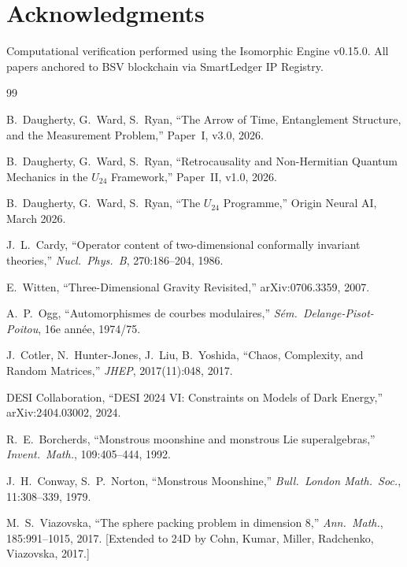 \documentclass[12pt,a4paper]{article}
\theoremstyle{definition}\newtheorem{definition}[theorem]{Definition}
\theoremstyle{remark}\newtheorem{remark}[theorem]{Remark}
\begin{document}
\section*{Acknowledgments}

Computational verification performed using the Isomorphic Engine v0.15.0.
All papers anchored to BSV blockchain via SmartLedger IP Registry.

\begin{thebibliography}{99}

 B.~Daugherty, G.~Ward, S.~Ryan, ``The Arrow of Time,
  Entanglement Structure, and the Measurement Problem,'' Paper~I, v3.0, 2026.

 B.~Daugherty, G.~Ward, S.~Ryan, ``Retrocausality and
  Non-Hermitian Quantum Mechanics in the $U_{24}$ Framework,'' Paper~II, v1.0, 2026.

 B.~Daugherty, G.~Ward, S.~Ryan, ``The $U_{24}$ Programme,''
  Origin Neural AI, March 2026.

 J.~L.~Cardy, ``Operator content of two-dimensional
  conformally invariant theories,'' \emph{Nucl.\ Phys.\ B}, 270:186--204, 1986.

 E.~Witten, ``Three-Dimensional Gravity Revisited,''
  arXiv:0706.3359, 2007.

 A.~P.~Ogg, ``Automorphismes de courbes modulaires,''
  \emph{S\'em.\ Delange-Pisot-Poitou}, 16e ann\'ee, 1974/75.

 J.~Cotler, N.~Hunter-Jones, J.~Liu, B.~Yoshida,
  ``Chaos, Complexity, and Random Matrices,'' \emph{JHEP}, 2017(11):048, 2017.

 DESI Collaboration, ``DESI 2024 VI: Constraints on Models
  of Dark Energy,'' arXiv:2404.03002, 2024.

 R.~E.~Borcherds, ``Monstrous moonshine and monstrous
  Lie superalgebras,'' \emph{Invent.\ Math.}, 109:405--444, 1992.

 J.~H.~Conway, S.~P.~Norton, ``Monstrous Moonshine,''
  \emph{Bull.\ London Math.\ Soc.}, 11:308--339, 1979.

 M.~S.~Viazovska, ``The sphere packing problem in
  dimension 8,'' \emph{Ann.\ Math.}, 185:991--1015, 2017. [Extended to 24D by
  Cohn, Kumar, Miller, Radchenko, Viazovska, 2017.]

\end{thebibliography}
\end{document}
